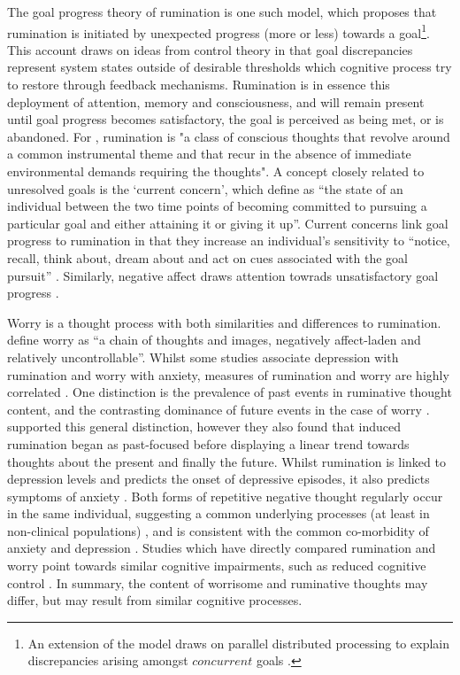 \documentclass[man,floatsintext,a4paper,biblatex]{apa6}\usepackage[]{graphicx}\usepackage[]{color}
\begin{document}
The goal progress theory of rumination \parencite{martin_ruminative_1996}
is one such model, which proposes that rumination is initiated
by unexpected progress (more or less) towards a goal\footnote{An
extension of the model draws on parallel distributed processing
to explain discrepancies arising amongst ${concurrent}$ goals
\parencite{martin_extending_2006}.}. This account draws on ideas
from control theory \parencite{carver_control_1982} in that
goal discrepancies represent system states outside of desirable
thresholds which cognitive process try to restore through feedback
mechanisms. Rumination is in essence this deployment of attention, memory
and consciousness, and will remain present until goal progress becomes
satisfactory, the goal is perceived as being met, or is abandoned. For
\textcite[][p. 7]{martin_ruminative_1996}, rumination is "a class of
conscious thoughts that revolve around a common instrumental theme and
that recur in the absence of immediate environmental demands requiring
the thoughts". A concept closely related to unresolved goals is the
`current concern', which \textcite[][p.14]{klinger_motivation_2011}
define as \enquote{the state of an individual between the two time points
of becoming committed to pursuing a particular goal and either attaining
it or giving it up}. Current concerns link goal progress to rumination
in that they increase an individual's sensitivity to \enquote{notice,
recall, think about, dream about and act on cues associated with the
goal pursuit} \parencite[][p.2]{klinger_motivation_2011}. Similarly,
negative affect draws attention towrads unsatisfactory goal progress
\parencite{martin_ruminative_1996}.

Worry is a thought process with both similarities and differences to
rumination. \textcite[][p. 10]{borkovec_preliminary_1983} define worry
as \enquote{a chain of thoughts and images, negatively affect-laden and
relatively uncontrollable}. Whilst some studies associate depression
with rumination and worry with anxiety, measures of rumination and worry
are highly correlated \parencite{smith_roadmap_2009}. One distinction
is the prevalence of past events in ruminative thought content,
and the contrasting dominance of future events in the case of worry
\parencite{papageorgiou_depressive_2004,watkins_comparisons_2005}.
\textcite{mclaughlin_effects_2007} supported this general distinction,
however they also found that induced rumination began as past-focused
before displaying a linear trend towards thoughts about the present and
finally the future. Whilst rumination is linked to depression levels
and predicts the onset of depressive episodes, it also predicts
symptoms of anxiety \parencite{nolen-hoeksema_role_2000}. Both
forms of repetitive negative thought regularly occur in the same
individual, suggesting a common underlying processes (at least in
non-clinical populations) \parencite{watkins_comparisons_2005}, and
is consistent with the common co-morbidity of anxiety and depression
\parencite{kessler_impairment_1999}. Studies which have directly compared
rumination and worry point towards similar cognitive impairments, such as
reduced cognitive control \parencite{beckwe_worrying_2014}. In summary,
the content of worrisome and ruminative thoughts may differ, but may
result from similar cognitive processes.
\end{document}
